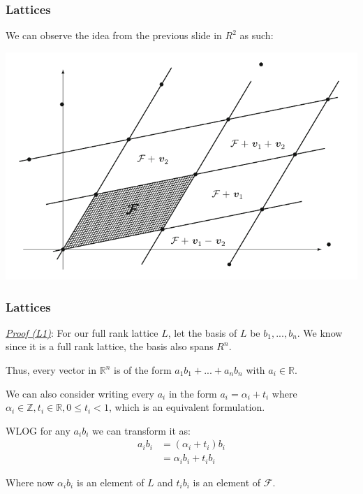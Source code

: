 \documentclass{beamer}
\begin{document}
\begin{frame}
\frametitle{Lattices}

We can observe the idea from the previous slide in $R^2$ as such:

\begin{center}
\includegraphics[scale=0.4]{Fundamental-para-span.png}
\end{center}

\end{frame}

\begin{frame}
\frametitle{Lattices}
\underline{\textit{Proof (L1)}}: For our full rank lattice $L$, let the basis of $L$ be $b_1,...,b_n$. We know since it is a full rank lattice, the basis also spans $R^n$.

Thus, every vector in $\mathbb{R}^n$ is of the form $a_1 b_1 + ...+ a_n b_n$ with $a_i \in \mathbb{R}$.

\vspace{1em}

We can also consider writing every $a_i$ in the form $a_i = \alpha_i + t_i$ where $\alpha_i \in \mathbb{Z}, t_i \in \mathbb{R}, 0 \leq t_i < 1$, which is an equivalent formulation.

\vspace{1em}

WLOG for any $a_i b_i$ we can transform it as:
\begin{align*}
a_i b_i &= (\alpha_i + t_i) b_i \\
 &= \alpha_i b_i + t_i b_i
\end{align*}

Where now $\alpha_i b_i$ is an element of $L$ and $t_i b_i$ is an element of $\mathcal{F}$.

\end{frame}
\end{document}
